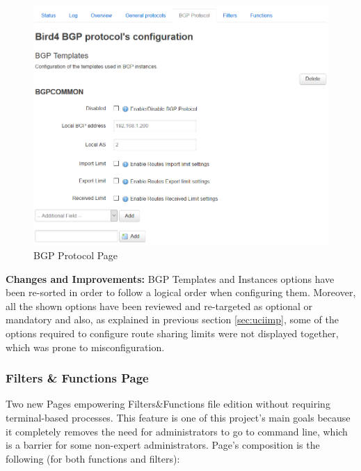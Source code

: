 \begin{figure}[H]
    \centering
    \includegraphics[width=\textwidth]{images/bird0.3/bgp}
    \caption{BGP Protocol Page}
    \label{fig:bgpp}
\end{figure}

\textbf{Changes and Improvements:}
BGP Templates and Instances options have been re-sorted in order to follow a logical order when configuring them. Moreover, all the shown options have been reviewed and re-targeted as optional or mandatory and also, as explained in previous section \ref{sec:uciimp}, some of the options required to configure route sharing limits were not displayed together, which was prone to misconfiguration.

\subsubsection{Filters \& Functions Page}
Two new Pages empowering Filters\&Functions file edition without requiring terminal-based processes. This feature is one of this project's main goals because it completely removes the need for administrators to go to command line, which is a barrier for some non-expert administrators. Page's composition is the following (for both functions and filters):

